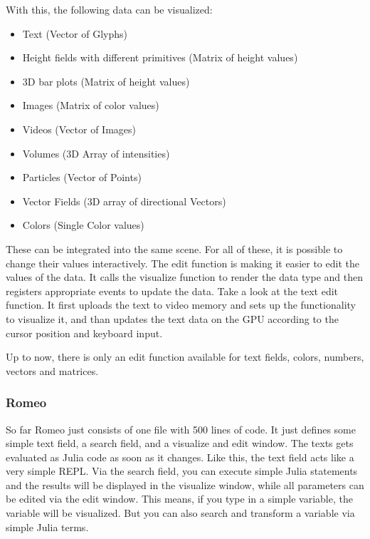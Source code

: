 With this, the following data can be visualized:
\begin{itemize}
	\item Text (Vector of Glyphs)
	\item Height fields with different primitives (Matrix of height values)
	\item 3D bar plots (Matrix of height values)
	\item Images (Matrix of color values)
	\item Videos (Vector of Images)
	\item Volumes (3D Array of intensities)
	\item Particles (Vector of Points)
	\item Vector Fields (3D array of directional Vectors)
	\item Colors (Single Color values)
\end{itemize}

These can be integrated into the same scene. For all of these, it is possible to change their values interactively.
The edit function is making it easier to edit the values of the data.
It calls the visualize function to render the data type and then registers appropriate events to update the data.
Take a look at the text edit function. 
It first uploads the text to video memory and sets up the functionality to visualize it, and than updates the text data on the GPU according to the cursor position and keyboard input.

Up to now, there is only an edit function available for text fields, colors, numbers, vectors and matrices.


\subsubsection{Romeo}
So far Romeo just consists of one file with 500 lines of code. It just defines some simple text field, a search field, and a visualize and edit window.
The texts gets evaluated as Julia code as soon as it changes. Like this, the text field acts like a very simple \ac{REPL}.
Via the search field, you can execute simple Julia statements and the results will be displayed in the visualize window, while all parameters can be edited via the edit window.
This means, if you type in a simple variable, the variable will be visualized. But you can also search and transform a variable via simple Julia terms.